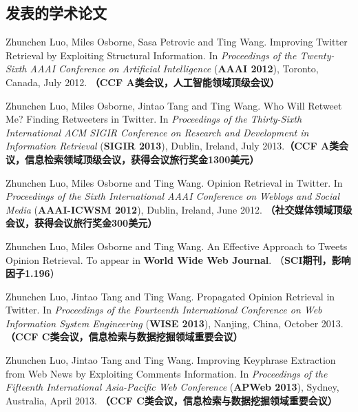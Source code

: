 \begin{resume}

  \section*{发表的学术论文} %

  \begin{enumerate}[{[}1{]}]
  \addtolength{\itemsep}{-.36\baselineskip}%
  
  \item Zhunchen Luo, Miles Osborne, Sasa Petrovic and Ting Wang. Improving Twitter Retrieval by Exploiting Structural Information. In {\it Proceedings of the Twenty-Sixth AAAI Conference on Artificial Intelligence} (\textbf{AAAI 2012}), Toronto, Canada, July 2012. \textbf{（CCF A类会议，人工智能领域顶级会议）}
 
 \item Zhunchen Luo, Miles Osborne, Jintao Tang and Ting Wang. Who Will Retweet Me? Finding Retweeters in Twitter. In {\it Proceedings of the Thirty-Sixth International ACM SIGIR Conference on Research and Development in Information Retrieval} (\textbf{SIGIR 2013}), Dublin, Ireland, July 2013.\textbf{（CCF A类会议，信息检索领域顶级会议，获得会议旅行奖金1300美元）}

\item Zhunchen Luo, Miles Osborne and Ting Wang. Opinion Retrieval in Twitter. In {\it Proceedings of the Sixth International AAAI Conference on Weblogs and Social Media} (\textbf{AAAI-ICWSM 2012}), Dublin, Ireland, June 2012. \textbf{（社交媒体领域顶级会议，获得会议旅行奖金300美元）}

 \item  Zhunchen Luo, Miles Osborne and Ting Wang. An Effective Approach to Tweets Opinion Retrieval. To appear in \textbf{World Wide Web Journal}. （\textbf{SCI期刊，影响因子1.196}）
 
 \item Zhunchen Luo, Jintao Tang and Ting Wang. Propagated Opinion Retrieval in Twitter. In {\it Proceedings of the Fourteenth International Conference on Web Information System Engineering} (\textbf{WISE 2013}), Nanjing, China, October 2013.\textbf{（CCF C类会议，信息检索与数据挖掘领域重要会议）}

\item Zhunchen Luo, Jintao Tang and Ting Wang. Improving Keyphrase Extraction from Web News by Exploiting Comments Information. In {\it Proceedings of the Fifteenth International Asia-Pacific Web Conference} (\textbf{APWeb 2013}), Sydney, Australia, April 2013. \textbf{（CCF C类会议，信息检索与数据挖掘领域重要会议）}


\end{enumerate}
\end{resume}
